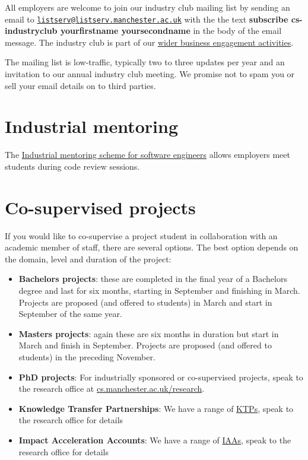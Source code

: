 \documentclass[
  12pt,
]{book}
\providecommand{\tightlist}{%
  \setlength{\itemsep}{0pt}\setlength{\parskip}{0pt}}
\begin{document}
All employers are welcome to join our industry club mailing list by sending an email to \href{mailto:listserv@listserv.manchester.ac.uk}{\nolinkurl{listserv@listserv.manchester.ac.uk}} with the the text \textbf{subscribe cs-industryclub yourfirstname yoursecondname} in the body of the email message. The industry club is part of our \href{https://www.cs.manchester.ac.uk/connect/business-engagement/}{wider business engagement activities}.

The mailing list is low-traffic, typically two to three updates per year and an invitation to our annual industry club meeting. We promise not to spam you or sell your email details on to third parties.

\hypertarget{mentoring}{%
\section{Industrial mentoring}\label{mentoring}}

The \href{https://www.cs.manchester.ac.uk/connect/business-engagement/industrial-mentoring/}{Industrial mentoring scheme for software engineers} allows employers meet students during code review sessions.

\hypertarget{cosupervise}{%
\section{Co-supervised projects}\label{cosupervise}}

If you would like to co-supervise a project student in collaboration with an academic member of staff, there are several options. The best option depends on the domain, level and duration of the project:

\begin{itemize}
\tightlist
\item
  \textbf{Bachelors projects}: these are completed in the final year of a Bachelors degree and last for six months, starting in September and finishing in March. Projects are proposed (and offered to students) in March and start in September of the same year.
\item
  \textbf{Masters projects}: again these are six months in duration but start in March and finish in September. Projects are proposed (and offered to students) in the preceding November.
\item
  \textbf{PhD projects}: For industrially sponsored or co-supervised projects, speak to the research office at \href{https://www.cs.manchester.ac.uk/research/}{cs.manchester.ac.uk/research}.
\item
  \textbf{Knowledge Transfer Partnerships}: We have a range of \href{https://www.gov.uk/guidance/knowledge-transfer-partnerships-what-they-are-and-how-to-apply}{KTPs}, speak to the research office for details
\item
  \textbf{Impact Acceleration Accounts}: We have a range of \href{https://epsrc.ukri.org/innovation/fundingforimpact/impact-acceleration-accounts/}{IAAs}, speak to the research office for details
\end{itemize}
\end{document}

